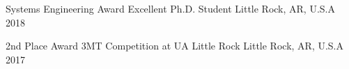 



\begin{cvhonors}
\cvhonor
	{Systems Engineering Award} %
	{Excellent Ph.D. Student} %
	{Little Rock, AR, U.S.A} %
	{2018} %

  \cvhonor
	{2nd Place Award} %
	{3MT Competition at UA Little Rock} %
	{Little Rock, AR, U.S.A} %
	{2017} %


%
%

\end{cvhonors}

